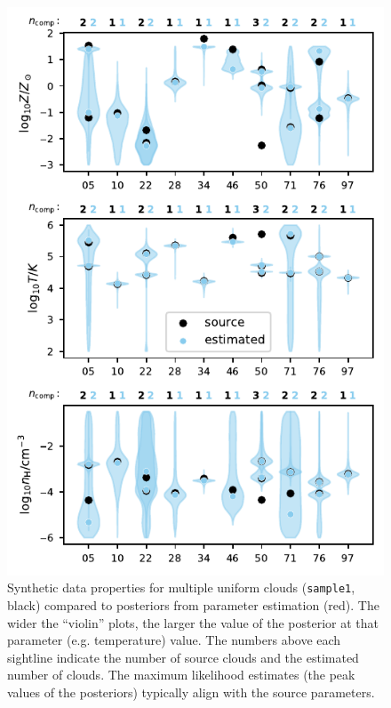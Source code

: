 \documentclass[fleqn,usenatbib]{mnras}
\begin{document}
\begin{figure}
    \centering
    \includegraphics[width=\columnwidth]{figures/sample1/comparison.pdf}
    \caption{
    Synthetic data properties for multiple uniform clouds (\texttt{sample1}, black) compared to posteriors from parameter estimation (red).
    The wider the ``violin'' plots, the larger the value of the posterior at that parameter (e.g. temperature) value.
    The numbers above each sightline indicate the number of source clouds and the estimated number of clouds.
    The maximum likelihood estimates (the peak values of the posteriors) typically align with the source parameters.
    }
    \label{f: sample1 violin}
\end{figure}
\end{document}
